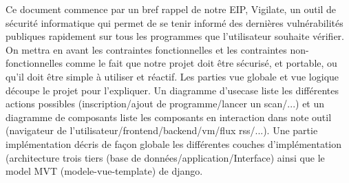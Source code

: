 Ce document commence par un bref rappel de notre EIP, Vigilate, un outil de sécurité informatique qui permet de se tenir informé des dernières vulnérabilités publiques rapidement sur tous les programmes que l’utilisateur souhaite vérifier. On mettra en avant les contraintes fonctionnelles et les contraintes non-fonctionnelles comme le fait que notre projet doit être sécurisé, et portable, ou qu'il doit être simple à utiliser et réactif. Les parties vue globale et vue logique découpe le projet pour l'expliquer. Un diagramme d'usecase liste les différentes actions possibles (inscription/ajout de programme/lancer un scan/...) et un diagramme de composants liste les composants en interaction dans note outil (navigateur de l'utilisateur/frontend/backend/vm/flux rss/...). Une partie implémentation décris de façon globale les différentes couches d'implémentation (architecture trois tiers (base de données/application/Interface) ainsi que le model MVT (modele-vue-template) de django.